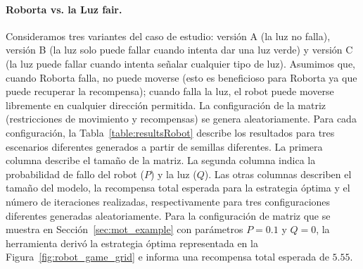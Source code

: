 \paragraph{Roborta vs. la Luz fair.}
Consideramos tres variantes del caso de estudio: versión A (la luz no falla), versión B (la luz solo puede fallar cuando intenta dar una luz verde) y versión C (la luz puede fallar cuando intenta señalar cualquier tipo de luz).
Asumimos que, cuando Roborta falla, no puede moverse (esto es beneficioso para Roborta ya que puede recuperar la recompensa);
cuando falla la luz, el robot puede moverse libremente en cualquier dirección permitida.
La configuración de la matriz (restricciones de movimiento y recompensas) se genera aleatoriamente. Para cada configuración, la Tabla~\ref{table:resultsRobot} describe los resultados para tres escenarios diferentes generados a partir de semillas diferentes. La primera columna describe el tamaño de la matriz. La segunda columna indica la probabilidad de fallo del robot ($P$) y la luz ($Q$).
Las otras columnas describen el tamaño del modelo, la recompensa total esperada para la estrategia óptima y el número de iteraciones realizadas, respectivamente para tres configuraciones diferentes generadas aleatoriamente.
Para la configuración de matriz que se muestra en Sección~\ref{sec:mot_example} con parámetros $P=0.1$ y $Q=0$, la herramienta derivó la estrategia óptima representada en la Figura~\ref{fig:robot_game_grid} e informa una recompensa total esperada de $5.55$.



